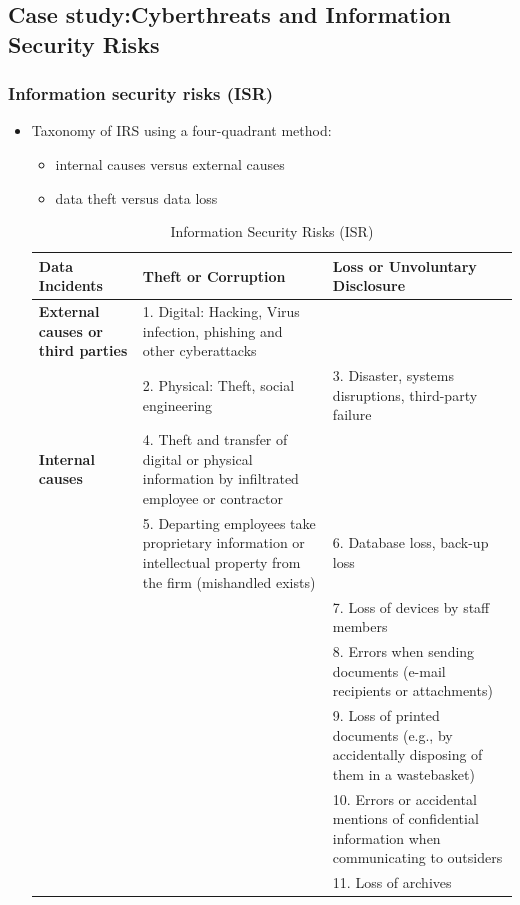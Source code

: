 


\subsection{ Case study:Cyberthreats and Information Security Risks}



\subsubsection{Information security risks (ISR) }
\begin{itemize}
\item Taxonomy of IRS using a four-quadrant method:
    \begin{itemize}
    \item internal causes versus external causes
    \item  data theft versus data loss
    \end{itemize}

    \begin{table}[H]
        \centering
        \caption{Information Security Risks (ISR)}
        \renewcommand{\arraystretch}{1.5} %
        \begin{tabular}{|p{6cm}|p{6cm}|p{6cm}|}
            \hline
            \textbf{Data Incidents} & \textbf{Theft or Corruption} & \textbf{Loss or Unvoluntary Disclosure} \\ \hline
            \textbf{External causes or third parties} & 
            1. Digital: Hacking, Virus infection, phishing and other cyberattacks \\ &  
            2. Physical: Theft, social engineering & 
            3. Disaster, systems disruptions, third-party failure \\ \hline
            \textbf{Internal causes} & 
            4. Theft and transfer of digital or physical information by infiltrated employee or contractor \\ & 5. Departing employees take proprietary information or intellectual property from the firm (mishandled exists) & 
            6. Database loss, back-up loss \\ & & 7. Loss of devices by staff members \\ & & 8. Errors when sending documents (e-mail recipients or attachments) \\ & & 9. Loss of printed documents (e.g., by accidentally disposing of them in a wastebasket) \\ & & 10. Errors or accidental mentions of confidential information when communicating to outsiders \\ & & 11. Loss of archives \\ \hline
        \end{tabular}
    \end{table}


\end{itemize}




